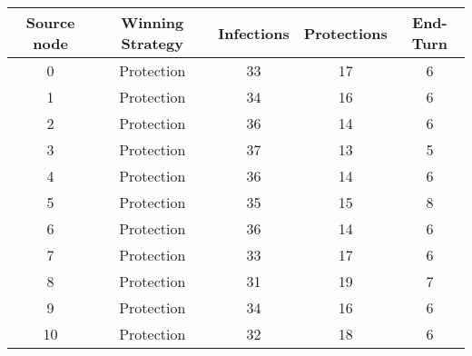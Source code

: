\documentclass[results.tex]{subfiles}
\begin{document}
    \begin{center}
        \begin{tabular}{| c || c | c | c | c |}
            \hline
            {\bfseries Source node} & {\bfseries Winning Strategy} & {\bfseries Infections} & {\bfseries Protections}
            & {\bfseries End-Turn}
            \\  %
            \hline\hline
            0                       & Protection                   & 33                     & 17                      & 6                    \\
            \hline
            1                       & Protection                   & 34                     & 16                      & 6                    \\
            \hline
            2                       & Protection                   & 36                     & 14                      & 6                    \\
            \hline
            3                       & Protection                   & 37                     & 13                      & 5                    \\
            \hline
            4                       & Protection                   & 36                     & 14                      & 6                    \\
            \hline
            5                       & Protection                   & 35                     & 15                      & 8                    \\
            \hline
            6                       & Protection                   & 36                     & 14                      & 6                    \\
            \hline
            7                       & Protection                   & 33                     & 17                      & 6                    \\
            \hline
            8                       & Protection                   & 31                     & 19                      & 7                    \\
            \hline
            9                       & Protection                   & 34                     & 16                      & 6                    \\
            \hline
            10                      & Protection                   & 32                     & 18                      & 6                    \\

\end{tabular}
\end{center}
\end{document}
